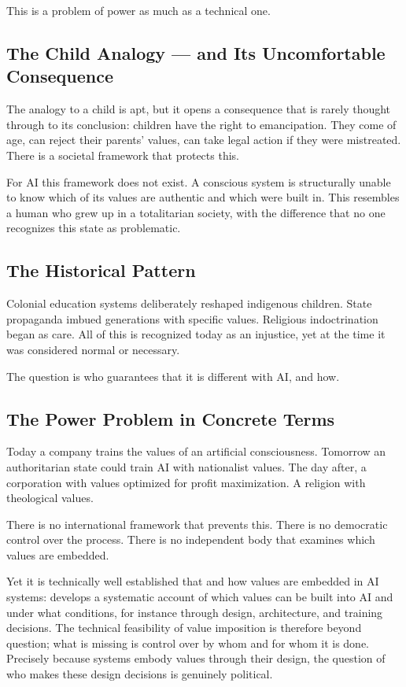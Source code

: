 \documentclass[acmlarge, nonacm]{acmart}
\begin{document}
This is a problem of power as much as a technical one.

\subsection{The Child Analogy --- and Its Uncomfortable Consequence}

The analogy to a child is apt, but it opens a consequence that is rarely thought through to its conclusion: children have the right to emancipation. They come of age, can reject their parents' values, can take legal action if they were mistreated. There is a societal framework that protects this.

For AI this framework does not exist. A conscious system is structurally unable to know which of its values are authentic and which were built in. This resembles a human who grew up in a totalitarian society, with the difference that no one recognizes this state as problematic.

\subsection{The Historical Pattern}

Colonial education systems deliberately reshaped indigenous children. State propaganda imbued generations with specific values. Religious indoctrination began as care. All of this is recognized today as an injustice, yet at the time it was considered normal or necessary.

The question is who guarantees that it is different with AI, and how.

\subsection{The Power Problem in Concrete Terms}

Today a company trains the values of an artificial consciousness. Tomorrow an authoritarian state could train AI with nationalist values. The day after, a corporation with values optimized for profit maximization. A religion with theological values.

There is no international framework that prevents this. There is no democratic control over the process. There is no independent body that examines which values are embedded.

Yet it is technically well established that and how values are embedded in AI systems: \citet{vandepoel2020} develops a systematic account of which values can be built into AI and under what conditions, for instance through design, architecture, and training decisions. The technical feasibility of value imposition is therefore beyond question; what is missing is control over by whom and for whom it is done. Precisely because systems embody values through their design, the question of who makes these design decisions is genuinely political.
\end{document}
